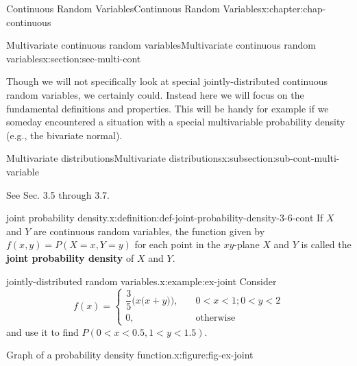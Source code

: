 \documentclass[oneside,10pt,]{book}
\newcommand{\terminology}[1]{\textbf{#1}}
\newcommand{\lt}{<}
\newcommand{\amp}{&}
\begin{document}
\begin{chapterptx}{Continuous Random Variables}{}{Continuous Random Variables}{}{}{x:chapter:chap-continuous}
\typeout{************************************************}
%
\begin{sectionptx}{Multivariate continuous random variables}{}{Multivariate continuous random variables}{}{}{x:section:sec-multi-cont}
\begin{introduction}{}%
Though we will not specifically look at special jointly-distributed continuous random variables, we certainly could.  Instead here we will focus on the fundamental definitions and properties.  This will be handy for example if we someday encountered a situation with a special multivariable probability density (e.g., the bivariate normal).%
\end{introduction}%
%
%
\typeout{************************************************}
\typeout{************************************************}
%
\begin{subsectionptx}{Multivariate distributions}{}{Multivariate distributions}{}{}{x:subsection:sub-cont-multi-variable}
\begin{introduction}{}%
See Sec. 3.5 through 3.7.%
\end{introduction}%
\begin{definition}{joint probability density.}{x:definition:def-joint-probability-density-3-6-cont}%
If \(X\) and \(Y\) are continuous random variables, the function given by \(f(x,y) = P(X=x, Y=y)\) for each point in the \(xy\)-plane \(X\) and \(Y\) is called the \terminology{joint probability density} of \(X\) and \(Y\).%
\end{definition}
\begin{example}{jointly-distributed random variables.}{x:example:ex-joint}%
Consider%
\begin{equation*}
f(x) = \begin{cases}\dfrac{3}{5}\Big(x\Big(x+y\Big)\Big),\amp \quad 0 \lt x \lt 1; 0 \lt y \lt 2\\
0,\amp \quad \text{otherwise}\end{cases}
\end{equation*}
and use it to find \(P(0 \lt x \lt 0.5, 1 \lt y \lt 1.5)\).%
\begin{figureptx}{Graph of a probability density function.}{x:figure:fig-ex-joint}{}%
\begin{image}{0.25}{0.5}{0.25}%

\end{image}
\end{figureptx}
\end{example}
\end{subsectionptx}
\end{sectionptx}
\end{chapterptx}
\end{document}
